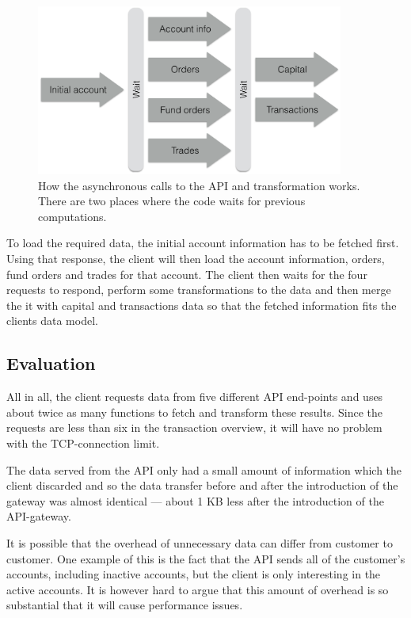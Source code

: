 \documentclass{cslthse-msc}
\begin{document}
\begin{figure}[H]
  \centering
    \begin{center}
      \includegraphics[width=0.9\textwidth]{images/bank_overview.png}
    \end{center}
  \caption{How the asynchronous calls to the API and transformation works. There are two places where the code waits for previous computations.}
\end{figure}

To load the required data, the initial account information has to be fetched first. Using that response, the client will then load the account information, orders, fund orders and trades for that account. The client then waits for the four requests to respond, perform some transformations to the data and then merge the it with capital and transactions data so that the fetched information fits the clients data model.

\subsection{Evaluation}
All in all, the client requests data from five different API end-points and uses about twice as many functions to fetch and transform these results. Since the requests are less than six in the transaction overview, it will have no problem with the TCP-connection limit.

The data served from the API only had a small amount of information which the client discarded and so the data transfer before and after the introduction of the gateway was almost identical --- about 1 KB less after the introduction of the API-gateway.

It is possible that the overhead of unnecessary data can differ from customer to customer. One example of this is the fact that the API sends all of the customer's accounts, including inactive accounts, but the client is only interesting in the active accounts. It is however hard to argue that this amount of overhead is so substantial that it will cause performance issues.
\end{document}
